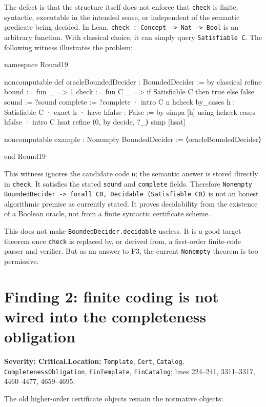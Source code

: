 \documentclass[11pt]{article}
\newcommand{\sev}[1]{\textbf{Severity: #1}}
\begin{document}
The defect is that the structure itself does not enforce that \texttt{check} is finite, syntactic, executable in the intended sense, or independent of the semantic predicate being decided. In Lean, \texttt{check : Concept -> Nat -> Bool} is an arbitrary function. With classical choice, it can simply query \texttt{Satisfiable C}. The following witness illustrates the problem:

\begin{leancode}
namespace Round19

noncomputable def oracleBoundedDecider : BoundedDecider := by
  classical
  refine
    { bound := fun _ => 1
      check := fun C _ => if Satisfiable C then true else false
      sound := ?sound
      complete := ?complete }
  · intro C n hcheck
    by_cases h : Satisfiable C
    · exact h
    · have hfalse : False := by simpa [h] using hcheck
      cases hfalse
  · intro C hsat
    refine ⟨0, by decide, ?_⟩
    simp [hsat]

noncomputable example : Nonempty BoundedDecider :=
  ⟨oracleBoundedDecider⟩

end Round19
\end{leancode}

This witness ignores the candidate code \texttt{n}; the semantic answer is stored directly in \texttt{check}. It satisfies the stated \texttt{sound} and \texttt{complete} fields. Therefore \texttt{Nonempty BoundedDecider -> forall C0, Decidable (Satisfiable C0)} is not an honest algorithmic premise as currently stated. It proves decidability from the existence of a Boolean oracle, not from a finite syntactic certificate scheme.

This does not make \texttt{BoundedDecider.decidable} useless. It is a good target theorem once \texttt{check} is replaced by, or derived from, a first-order finite-code parser and verifier. But as an answer to F3, the current \texttt{Nonempty} theorem is too permissive.

\section{Finding 2: finite coding is not wired into the completeness obligation}

\sev{Critical.}\quad \textbf{Location:} \texttt{Template}, \texttt{Cert}, \texttt{Catalog}, \texttt{CompletenessObligation}, \texttt{FinTemplate}, \texttt{FinCatalog}; lines 224--241, 3311--3317, 4460--4477, 4659--4695.

The old higher-order certificate objects remain the normative objects:
\end{document}

